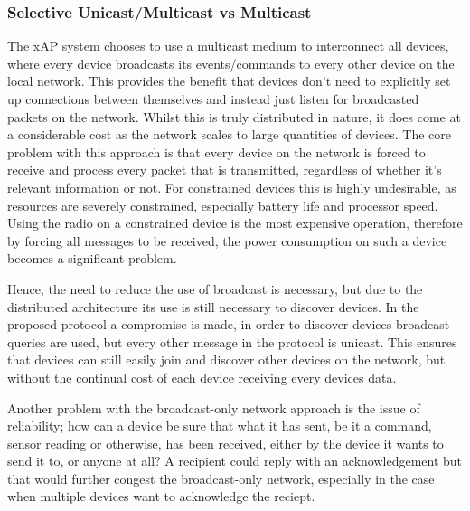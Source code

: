 \subsubsection{Selective Unicast/Multicast vs Multicast} %
\label{ssub:selective_unicast_multicast_vs_multicast}
The xAP system chooses to use a multicast medium to interconnect all devices, where every device broadcasts its events/commands to every other device on the local network. This provides the benefit that devices don't need to explicitly set up connections between themselves and instead just listen for broadcasted packets on the network. Whilst this is truly distributed in nature, it does come at a considerable cost as the network scales to large quantities of devices. The core problem with this approach is that every device on the network is forced to receive and process every packet that is transmitted, regardless of whether it's relevant information or not. For constrained devices this is highly undesirable, as resources are severely constrained, especially battery life and processor speed. Using the radio on a constrained device is the most expensive operation, therefore by forcing all messages to be received, the power consumption on such a device becomes a significant problem. 

Hence, the need to reduce the use of broadcast is necessary, but due to the distributed architecture its use is still necessary to discover devices. In the proposed protocol a compromise is made, in order to discover devices broadcast queries are used, but every other message in the protocol is unicast. This ensures that devices can still easily join and discover other devices on the network, but without the continual cost of each device receiving every devices data.

Another problem with the broadcast-only network approach is the issue of reliability; how can a device be sure that what it has sent, be it a command, sensor reading or otherwise, has been received, either by the device it wants to send it to, or anyone at all? A recipient could reply with an acknowledgement but that would further congest the broadcast-only network, especially in the case when multiple devices want to acknowledge the reciept.


